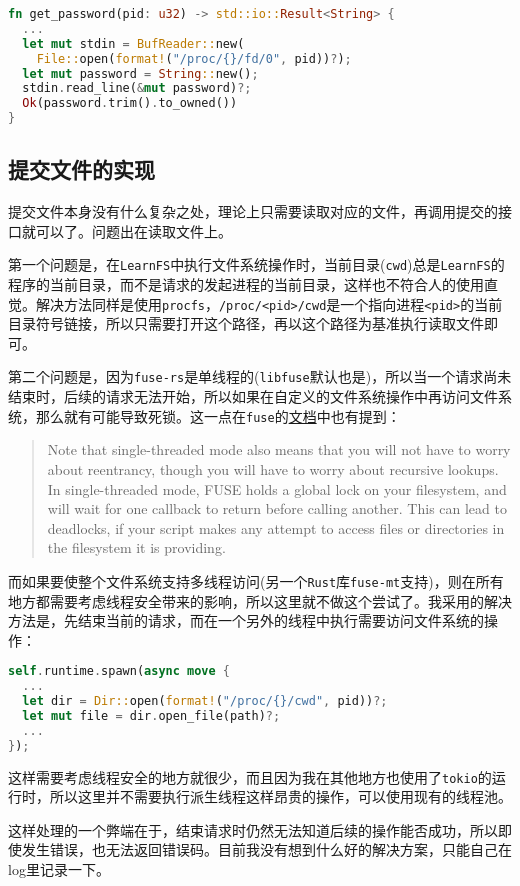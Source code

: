 \documentclass[12pt, UTF8]{article}
\begin{document}
\begin{lstlisting}[language = Rust]
fn get_password(pid: u32) -> std::io::Result<String> {
  ...
  let mut stdin = BufReader::new(
    File::open(format!("/proc/{}/fd/0", pid))?);
  let mut password = String::new();
  stdin.read_line(&mut password)?;
  Ok(password.trim().to_owned())
}
\end{lstlisting}

\subsection{提交文件的实现}

提交文件本身没有什么复杂之处，理论上只需要读取对应的文件，再调用提交的接口就可以了。问题出在读取文件上。

第一个问题是，在\lstinline|LearnFS|中执行文件系统操作时，当前目录(\lstinline|cwd|)总是\lstinline|LearnFS|的程序的当前目录，而不是请求的发起进程的当前目录，这样也不符合人的使用直觉。解决方法同样是使用\lstinline|procfs|，\lstinline|/proc/<pid>/cwd|是一个指向进程\lstinline|<pid>|的当前目录符号链接，所以只需要打开这个路径，再以这个路径为基准执行读取文件即可。

第二个问题是，因为\lstinline|fuse-rs|是单线程的(\lstinline|libfuse|默认也是)，所以当一个请求尚未结束时，后续的请求无法开始，所以如果在自定义的文件系统操作中再访问文件系统，那么就有可能导致死锁。这一点在\lstinline|fuse|的\href{https://linux.die.net/man/3/fuse}{文档}中也有提到：

\begin{quotation}
Note that single-threaded mode also means that you will not have to worry about reentrancy, though you will have to worry about recursive lookups. In single-threaded mode, FUSE holds a global lock on your filesystem, and will wait for one callback to return before calling another. This can lead to deadlocks, if your script makes any attempt to access files or directories in the filesystem it is providing.
\end{quotation}

而如果要使整个文件系统支持多线程访问(另一个\lstinline|Rust|库\lstinline|fuse-mt|支持)，则在所有地方都需要考虑线程安全带来的影响，所以这里就不做这个尝试了。我采用的解决方法是，先结束当前的请求，而在一个另外的线程中执行需要访问文件系统的操作：

\begin{lstlisting}[language = Rust]
self.runtime.spawn(async move {
  ...
  let dir = Dir::open(format!("/proc/{}/cwd", pid))?;
  let mut file = dir.open_file(path)?;
  ...
});
\end{lstlisting}

这样需要考虑线程安全的地方就很少，而且因为我在其他地方也使用了\lstinline|tokio|的运行时，所以这里并不需要执行派生线程这样昂贵的操作，可以使用现有的线程池。

这样处理的一个弊端在于，结束请求时仍然无法知道后续的操作能否成功，所以即使发生错误，也无法返回错误码。目前我没有想到什么好的解决方案，只能自己在log里记录一下。
\end{document}

